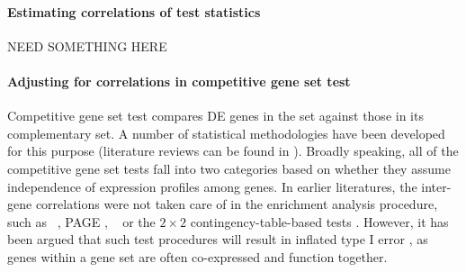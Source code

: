\paragraph{Estimating correlations of test statistics}
NEED SOMETHING HERE

\paragraph{Adjusting for correlations in competitive gene set test}
Competitive gene set test compares DE genes in the set against those in its complementary set. A
number of
statistical methodologies have been developed for this purpose (literature reviews can be found in
\cite{huang2009bioinformatics,khatri2012ten, mishra2014gene}). Broadly speaking, all of the
competitive gene set tests fall into two categories based on whether they assume independence of
expression profiles among genes. In earlier literatures, the inter-gene correlations were not taken
care of in the enrichment analysis procedure, such as \gent~\citep{tian2005discovering}, PAGE
\citep{kim2005page}, \genr~\citep{michaud2008integrative} or the $2\times 2$ contingency-table-based
tests \cite{alexa2010topgo, huang2007david,ye2006wego}. However, it has been argued that such test
procedures will result in inflated type I error 
\citep{efron2007testing,gatti2010heading,goeman2007analyzing,
	wu2012camera,yaari2013quantitative}, as genes within a gene set are often
co-expressed and function together.

